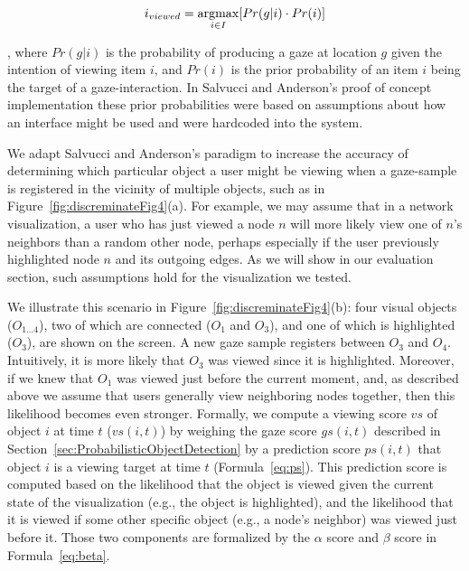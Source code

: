 \begin{equation*}
i_{viewed} = \displaystyle \operatorname*{argmax}_{i\in I}[Pr(g|i)\cdot Pr(i)]
\end{equation*}

, where $Pr(g|i)$ is the probability of producing a gaze at location $g$ given the intention of viewing item $i$, and $Pr(i)$ is the prior probability of an item $i$  being the target of a gaze-interaction. In Salvucci and Anderson's proof of concept implementation these prior probabilities were based on assumptions about how an interface might be used and were hardcoded into the system.  


We adapt Salvucci and Anderson's paradigm to increase the accuracy of determining which particular object a user might be viewing when a gaze-sample is registered in the vicinity of multiple objects, such as in Figure~\ref{fig:discreminateFig4}(a). For example, we may assume that in a network visualization, a user who has just viewed a node $n$ will more likely view one of $n$'s neighbors than a random other node, perhaps especially if the user previously highlighted node $n$ and its outgoing edges.  As we will show in our evaluation section, such assumptions hold for the visualization we tested. 

We illustrate this scenario in Figure~\ref{fig:discreminateFig4}(b): four visual objects ($O_{1\ldots 4}$), two of which are connected ($O_1$ and $O_3$), and one of which is highlighted ($O_3$), are shown on the screen. A new gaze sample registers between $O_3$ and $O_4$. Intuitively, it is more likely that $O_3$ was viewed since it is highlighted. Moreover, if we knew that $O_1$ was viewed just before the current moment, and, as described above we assume that users generally view neighboring nodes together, then this likelihood becomes even stronger.  
Formally, we compute a viewing score $vs$ of object $i$ at time $t$ ($vs(i,t)$) by weighing the gaze score $gs(i,t)$ described in Section~\ref{sec:ProbabilisticObjectDetection} by a prediction score $ps(i,t)$ that object $i$ is a viewing target at time $t$ (Formula~\ref{eq:ps}). This prediction score is computed based on the likelihood that the object is viewed given the current state of the visualization (e.g., the object is highlighted), and the likelihood that it is viewed if some other specific object (e.g.,  a node's neighbor) was viewed just before it. Those two components are formalized by the  $\alpha$ score and $\beta$ score in Formula~\ref{eq:beta}.

